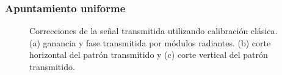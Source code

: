 \subsubsection{Apuntamiento uniforme}

\begin{figure}[H]
	\centering

	\caption{Correcciones de la señal transmitida utilizando calibración clásica. (a) ganancia y fase transmitida por módulos
		radiantes. (b) corte horizontal del patrón transmitido y (c) corte vertical del patrón transmitido.}
	\label{fig:nonErrClassical0deg}
\end{figure}

